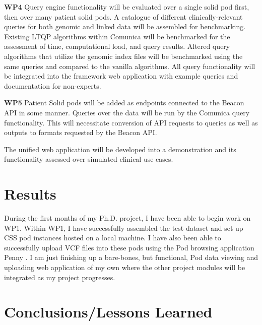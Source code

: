 \documentclass[runningheads]{llncs}
\begin{document}
\textbf{WP4}
Query engine functionality will be evaluated over a single solid pod first, then over many patient solid pods. 
A catalogue of different clinically-relevant queries for both genomic and linked data will be assembled for benchmarking.
Existing LTQP algorithms within Comunica will be benchmarked for the assessment of time, computational load, and query results.
Altered query algorithms that utilize the genomic index files will be benchmarked using the same queries and compared to the vanilla algorithms.
All query functionality will be integrated into the framework web application with example queries and documentation for non-experts.

\textbf{WP5}
Patient Solid pods will be added as endpoints connected to the Beacon API in some manner. 
Queries over the data will be run by the Comunica query functionality.
This will necessitate conversion of API requests to queries as well as outputs to formats requested by the Beacon API.

The unified web application will be developed into a demonstration and its functionality assessed over simulated clinical use cases.


\section{Results}

During the first months of my Ph.D. project, I have been able to begin work on WP1. 
Within WP1, I have successfully assembled the test dataset and set up CSS pod instances hosted on a local machine.
I have also been able to successfully upload VCF files into these pods using the Pod browsing application Penny \cite{penny}. 
I am just finishing up a bare-bones, but functional, Pod data viewing and uploading web application of my own where the other project modules will be integrated as my project progresses.


\section{Conclusions/Lessons Learned}

\end{document}
